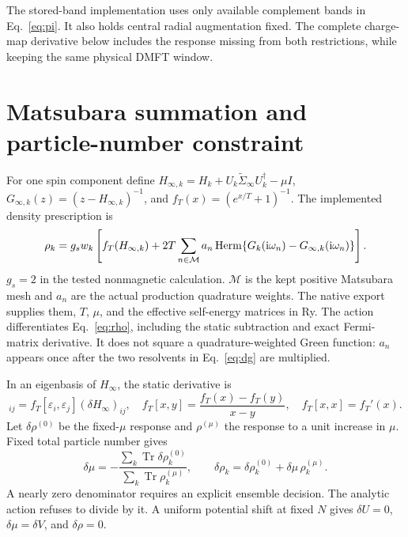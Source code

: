 \documentclass[11pt]{article}
\newcommand{\Tr}{\operatorname{Tr}}
\newcommand{\Herm}{\operatorname{Herm}}
\newcommand{\ii}{\mathrm i}
\begin{document}
The stored-band implementation uses only available complement bands in
Eq.~\eqref{eq:pi}. It also holds central radial augmentation fixed.
The complete charge-map derivative below includes the response missing
from both restrictions, while keeping the same physical DMFT window.

\section{Matsubara summation and particle-number constraint}
For one spin component define
$H_{\infty,k}=H_k+U_k\widetilde\Sigma_\infty U_k^\dagger-\mu I$,
$G_{\infty,k}(z)=(z-H_{\infty,k})^{-1}$, and
$f_T(x)=(e^{x/T}+1)^{-1}$. The implemented density prescription is
\begin{equation}
 \rho_k=g_s w_k\left[f_T(H_{\infty,k})+
 2T\sum_{n\in{\cal M}} a_n\Herm\{G_k(\ii\omega_n)-G_{\infty,k}(\ii\omega_n)\}\right].
 \label{eq:rho}
\end{equation}
$g_s=2$ in the tested nonmagnetic calculation. $\mathcal M$ is the kept
positive Matsubara mesh and $a_n$ are the actual production quadrature
weights. The native export supplies them, $T$, $\mu$, and the effective
self-energy matrices in Ry. The action differentiates Eq.~\eqref{eq:rho},
including the static subtraction and exact Fermi-matrix derivative. It
does not square a quadrature-weighted Green function: $a_n$ appears once
after the two resolvents in Eq.~\eqref{eq:dg} are multiplied.

In an eigenbasis of $H_\infty$, the static derivative is
\begin{equation}
 [L_f(H_\infty;\delta H_\infty)]_{ij}
 =f_T[\varepsilon_i,\varepsilon_j](\delta H_\infty)_{ij},\quad
 f_T[x,y]=\frac{f_T(x)-f_T(y)}{x-y},\quad f_T[x,x]=f_T'(x).
\end{equation}
Let $\delta\rho^{(0)}$ be the fixed-$\mu$ response and $\rho^{(\mu)}$
the response to a unit increase in $\mu$. Fixed total particle number gives
\begin{equation}
 \delta\mu=-\frac{\sum_k\Tr\delta\rho_k^{(0)}}
 {\sum_k\Tr\rho_k^{(\mu)}},\qquad
 \delta\rho_k=\delta\rho_k^{(0)}+\delta\mu\,\rho_k^{(\mu)}.
\end{equation}
A nearly zero denominator requires an explicit ensemble decision. The
analytic action refuses to divide by it. A uniform potential shift at
fixed $N$ gives $\delta U=0$, $\delta\mu=\delta V$, and $\delta\rho=0$.
\end{document}
